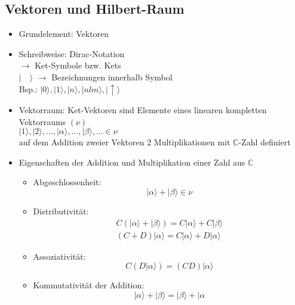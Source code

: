 \documentclass[10pt,article,colorback,accentcolor=tud9d]{scrartcl}
\begin{document}
\subsection{Vektoren und Hilbert-Raum}
\begin{itemize}
\item Grundelement: Vektoren
\item Schreibweise: Dirac-Notation\\
$\rightarrow$ Ket-Symbole bzw. Kets\\
$\left| \quad \rangle  \right.$ $\rightarrow$ Bezeichnungen innerhalb Symbol\\
Bsp.: $\left| 0\rangle \right.,\left|1\rangle \right.,\left|n\rangle \right.,\left|nlm\rangle \right.,
\left| \uparrow\rangle \right.$
\item Vektorraum: Ket-Vektoren sind Elemente eines linearen kompletten 
Vektorraums $(\nu)$\\
$\left|1\rangle \right.,\left|2\rangle \right.,...,\left|\alpha\rangle \right.,...,\left|\beta\rangle 
\right.,... \in \nu$\\
auf dem Addition zweier Vektoren 2 Multiplikationen mit $\mathbb{C}$-Zahl 
definiert
\item Eigenschaften der Addition und Multiplikation einer Zahl aus $\mathbb{C}$
\begin{fleqn}
\begin{itemize}
\item Abgeschlossenheit: 
\begin{equation} 
\left| \alpha \rangle \right.+\left|\beta\rangle \right. \in \nu
\end{equation}
\item Distributivität: 
\begin{equation}
\begin{aligned}
C(\left|\alpha\rangle \right. +\left|\beta\rangle \right.) = C\left|\alpha\rangle \right. +C\left|
\beta\rangle \right.\\
(C+D)\left|\alpha\rangle \right. = C\left|\alpha\rangle \right. +D\left|\alpha\rangle \right.
\end{aligned}
\end{equation}
\item Assoziativität: 
\begin{equation}
C(D\left|\alpha\rangle \right.)=(CD)\left|\alpha\rangle \right.
\end{equation}
\item Kommutativität der Addition: 
\begin{equation}
\left|\alpha\rangle \right. + \left|\beta\rangle \right. =\left|\beta\rangle \right. + \left|\alpha

\end{equation}
\end{itemize}
\end{fleqn}
\end{itemize}
\end{document}
